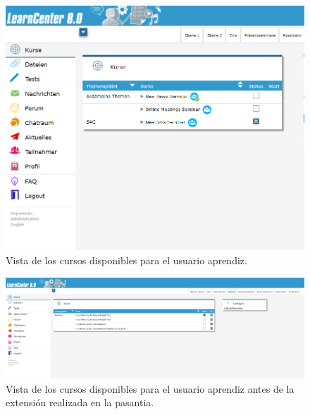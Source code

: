 \begin{figure}[h]
	\begin{center}
		\includegraphics[width=\textwidth]{screenshots/user_listar_cursos2.png}
		\caption{Vista de los cursos disponibles para el usuario aprendiz.} \label{fig:aprendizListarCursos}
	\end{center}
\end{figure}

\begin{figure}[h]
	\begin{center}
		\includegraphics[width=\textwidth]{screenshots/user_listar_seminar_viejo.png}
		\caption{Vista de los cursos disponibles para el usuario aprendiz antes de la extensión realizada en la pasantia.} \label{fig:aprendizListarViejo}
	\end{center}
\end{figure}

